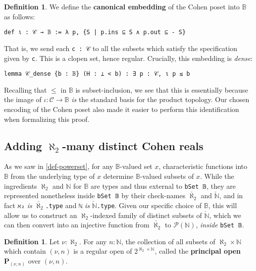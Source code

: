 \documentclass[a4paper,USenglish,cleveref, autoref]{lipics-v2019}
\newcommand{\B}{\mathbb{B}}
\newcommand{\lil}{\lstinline}
\newcommand{\N}{\mathbb{N}}
\theoremstyle{theorem}
\theoremstyle{definition}
\newtheorem{defn}[definition]{Definition}
\begin{document}
\begin{defn}
  We define the \textbf{canonical embedding} of the Cohen poset into $\B$ as follows:
  \begin{lstlisting}
def ι : 𝒞 → 𝔹 := λ p, {S | p.ins ⊆ S ∧ p.out ⊆ - S}
\end{lstlisting}
\end{defn}
That is, we send each \lil{c : 𝒞} to all the subsets which satisfy the specification given by \lil{c}. This is a clopen set, hence regular. Crucially, this embedding is \emph{dense}:
\begin{lstlisting}
lemma 𝒞_dense {b : 𝔹} (H : ⊥ < b) : ∃ p : 𝒞, ι p ≤ b
\end{lstlisting}
Recalling that $\leq$ in $\B$ is subset-inclusion, we see that this is essentially because the image of $\iota : \mathcal{C} \to \B$ \emph{is} the standard basis for the product topology. Our chosen encoding of the Cohen poset also made it easier to perform this identification when formalizing this proof.
\subsection{Adding $\aleph_2$-many distinct Cohen reals} \label{subsect:cohen-reals}
As we saw in \autoref{def-powerset}, for any $\B$-valued set $x$, characteristic functions into $\B$ from the underlying type of $x$ determine $\B$-valued subsets of $x$. While the ingredients $\aleph_2$ and $\mathbb{N}$ for $\B$ are types and thus external to \lil{bSet 𝔹}, they are represented nonetheless inside \lil{bSet 𝔹} by their check-names $\check{\aleph_2}$ and $\check{\mathbb{N}}$, and in fact \lil{ℵ₂} \emph{is} $\check{\aleph_2}$\lil{.type} and \lil{ℕ} \emph{is} $\check{\mathbb{N}}$\lil{.type}. Given our specific choice of $\B$, this will allow us to construct an $\aleph_2$-indexed family of distinct subsets of $\check{\N}$, which we can then convert into an injective function from $\check{\aleph_2}$ to $\mathcal{P}(\mathbb{N})$, \emph{inside} \lil{bSet 𝔹}.

\begin{defn}
  Let $\nu : \aleph_2$. For any $n : \N$, the collection of all subsets of $\aleph_2 \times \N$ which contain $(\nu, n)$ is a regular open of $2^{\aleph_2 \times \N}$, called the \textbf{principal open} $\mathbf{P}_{(\nu, n)}$ over $(\nu, n)$.
\end{defn}
\end{document}
